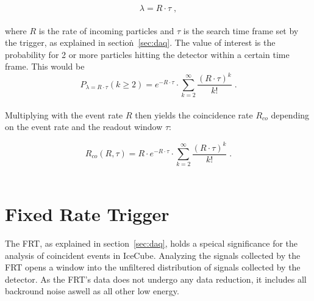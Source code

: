 \begin{equation}
    \lambda = R \cdot \tau \; ,
\end{equation}\\

where $R$ is the rate of incoming particles and $\tau$ is the search time frame set by the trigger, as explained in section\.~\ref{sec:daq}. 
The value of interest is the probability for 2 or more particles hitting the detector within a certain time frame. This would be \\

\begin{equation}
    P_{\lambda = R\cdot\tau}(k\geq2) = e^{- R\cdot\tau} \cdot \sum_{k=2}^\infty \frac{{(R\cdot\tau)}^k}{k!} \; .
\end{equation}\\ 

Multiplying with the event rate $R$ then yields the coincidence rate $R_{co}$ depending on the event rate and the readout window $\tau$:

\begin{equation}
    R_{co}(R,\tau) = R \cdot e^{- R\cdot\tau} \cdot \sum_{k=2}^\infty \frac{{(R\cdot\tau)}^k}{k!}\;.
\end{equation}\\

\section{Fixed Rate Trigger}

The FRT, as explained in section\@~\ref{sec:daq}, holds a speical significance for the analysis of coincident events in IceCube. 
Analyzing the signals collected by the FRT opens a window into the unfiltered distribution of signals collected by the detector. 
As the FRT's data does not undergo any data reduction, it includes all backround noise aswell as all other low energy. 

